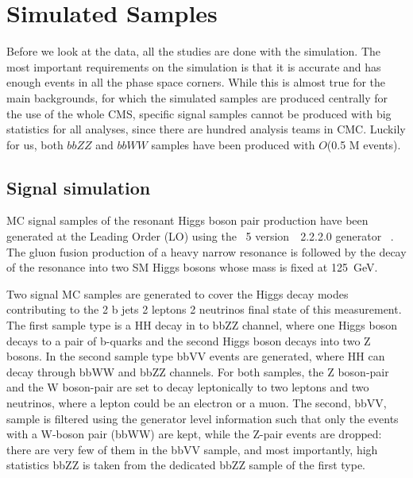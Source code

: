 \section{Simulated Samples}
\label{sec:simulated_samples}

Before we look at the data, all the studies are done with the simulation. The most important requirements on the simulation is that it is accurate and has enough events in all the phase space corners. While this is almost true for the main backgrounds, for which the simulated samples are produced centrally for the use of the whole CMS, specific signal samples cannot be produced with big statistics for all analyses, since there are hundred analysis teams in CMC. Luckily for us, both $bbZZ$ and $bbWW$ samples have been produced with $O$(0.5 M events).

\subsection{Signal simulation\label{sec:signalMC}}




MC signal samples of the resonant Higgs boson pair production have been generated at the Leading Order (LO) using the \MADGRAPH~5 version\ ~2.2.2.0  generator ~\cite{Alwall:2014hca}. The gluon fusion production of a heavy narrow resonance is followed by the decay of the resonance into two SM Higgs bosons whose mass is fixed at 125~GeV.

Two signal MC samples are generated to cover the Higgs decay modes contributing to the 2 b jets 2 leptons 2 neutrinos final state of this measurement. The first sample type is a HH decay in to bbZZ channel, where one Higgs boson decays to a pair of b-quarks and the second Higgs boson decays into two Z bosons. In the second sample type bbVV events are generated, where HH can decay through bbWW and bbZZ channels. For both samples, the Z boson-pair and the W boson-pair are set to decay leptonically to two leptons and two neutrinos, where a lepton could be an electron or a muon. The second, bbVV, sample is filtered using the generator level information such that only the events with a W-boson pair (bbWW) are kept, while the Z-pair events are dropped: there are very few of them in the bbVV sample, and most importantly, high statistics bbZZ is taken from the dedicated bbZZ sample of the first type.

